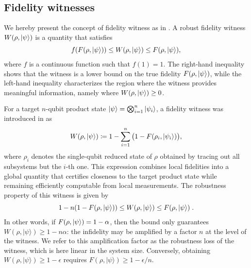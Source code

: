 \documentclass[a4paper,twocolumn,11pt,unpublished]{../../revision/quantumarticle}
\begin{document}
\subsection{Fidelity witnesses}
\label{subsection:prelims:witness}
We hereby present the concept of fidelity witness as in \cite{CGKM21efficient, UC24efficient}. A {robust fidelity witness} $W(\rho, \ket{\psi})$ is a quantity that satisfies
\begin{equation}
\label{eq: robust fidelity witness}
    f(F(\rho, \ket{\psi}))
    \leq W(\rho, \ket{\psi}) 
    \leq F(\rho, \ket{\psi}) ,
\end{equation}
where $f$ is a continuous function such that $f(1) = 1$. 
The right-hand inequality shows that the witness is a {lower bound} on the true fidelity $F(\rho, \ket{\psi})$, while the left-hand inequality characterizes the region where the witness provides meaningful information, namely where $W(\rho, \ket{\psi}) \ge 0$.

For a target $n$-qubit product state $\ket{\psi}=\bigotimes_{i=1}^n\ket{\psi_i}$, a fidelity witness was introduced in \cite{CGKM21efficient} as
\begin{equation}
    \label{eq:prelims:witness}
    W(\rho, \ket{\psi}) 
    \coloneqq 1 - 
    \sum_{i=1}^{n}
    \big(1 - F(\rho_i, \ket{\psi_i})\big),
\end{equation}
where $\rho_i$ denotes the single-qubit reduced state of $\rho$ obtained by tracing out all subsystems but the $i$-th one.
This expression combines local fidelities into a global quantity that certifies closeness to the target product state while remaining efficiently computable from local measurements. The {robustness} property of this witness is given by \cite{CGKM21efficient}
\begin{equation}
    \label{eq:prelims:witness:robustness}
    1-n(1-F(\rho, \ket\psi)) \leq W(\rho, \ket\psi)\leq F(\rho, \ket\psi)\; .
\end{equation}
In other words, if $F(\rho,\ket\psi)=1-\alpha$, then the bound only guarantees $W(\rho,|\psi\rangle)\geq 1-n\alpha$: the infidelity may be amplified by a factor $n$ at the level of the witness. We refer to this amplification factor as the robustness loss of the witness, which is here linear in the system size. Conversely, obtaining $W(\rho,|\psi\rangle)\geq 1-\epsilon$ requires $F(\rho,|\psi\rangle)\geq 1-\epsilon/n$.
\end{document}
